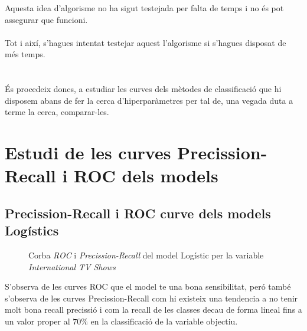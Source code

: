 \documentclass[a4paper, 11pt]{article}
\begin{document}
Aquesta idea d'algorisme no ha sigut testejada per falta de temps i no és pot assegurar que funcioni. \\\\
Tot i així, s'hagues intentat testejar aquest l'algorisme si s'hagues disposat de més temps. \\\\\\
És procedeix doncs, a estudiar les curves dels mètodes de classificació que hi disposem abans de fer la cerca d'hiperparàmetres per tal de, una vegada duta a terme la cerca, comparar-les.
\newpage
\section{Estudi de les curves Precission-Recall i ROC dels models}
\subsection{Precission-Recall i ROC curve dels models Logístics}
\begin{figure}[h]
\centering
    \caption{Corba \textit{ROC} i \textit{Precission-Recall} del model Logístic per la variable \textit{International TV Shows}}
    \label{fig:my_label}
\end{figure}
\hspace{-1.5em}S'observa de les curves ROC que el model te una bona sensibilitat, peró també s'observa de les curves Precission-Recall com hi existeix una tendencia a no tenir molt bona recall precissió i com la recall de les classes decau de forma lineal fins a un valor proper al $70\%$ en la classificació de la variable objectiu.\\\\
\end{document}
